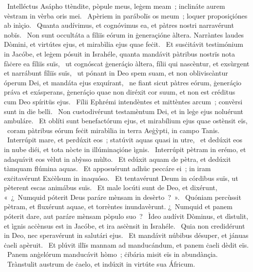 {~Intelléctus Asápho}
{%
ttèndite, pòpule meus, leġem meam~; inclináte aurem vèstram in vèrba oris mei.
~Apèriem in parábolïs os meum~; loquer proposiçiónes ab inìçio.
~Quanta audívimus, et cognóvimus ea, et pàtres nostri narravérunt nobïs.
~Non sunt occultáta a fíliïs eórum in ġeneraçióne àltera. Narràntes laudes Dòmini, et virtútes ejus, et mirabìlia ejus quae feċit.
~Et susċitávit testimónium in Jacóbe, et leġem pósuit in Israhéle, quanta mandávit pàtribus nostrïs nota fàċere ea fíliïs suïs,
~ut cognóscat ġeneráçio àltera, fílii qui nascèntur, et exsùrgent et narrábunt fíliïs suïs,
~ut pónant in Deo spem suam, et non obliviscàntur óperum Dei, et mandáta ejus exquírant,
~ne fiant sicut pàtres eórum, ġeneráçio práva et exásperans, ġeneráçio quae non diréxit cor suum, et non est créditus cum Deo spíritüs ejus.
~Fílii Ephrémi intendèntes et mittèntes arcum~; convèrsi sunt in die belli.
~Non custodivérunt testamèntum Dei, et in leġe ejus noluérunt ambuláre.
~Et oblíti sunt benefactórum ejus, et mirabílium ejus quae ostènsit eïs,
~coram pàtribus eórum feċit mirabìlia in terra Aeġỳpti, in campo Tanis.
~Interrúpit mare, et perdúxit eos~; statúvit aquas quasi in utre,
~et dedúxit eos in nube diéi, et tota nòcte in illúminaçióne ìgnis.
~Interrúpit pètram in erémo, et adaquávit eos vèlut in abỳsso mùlto.
~Et edúxit aquam de pètra, et dedúxit tàmquam flúmina aquas.
~Et apposuérunt adhüc peccáre ei~; in iram exċitavérunt Exċèlsum in inaquóso.
~Et tentavérunt Deum in córdibus suïs, ut pèterent escas animábus suïs.
~Et male locúti sunt de Deo, et dixérunt, «~¿~Numquid póterit Deus paráre mènsam in desèrto~?~».
~Quóniam percùssit pètram, et fluxérunt aquae, et torrèntes inundavèrunt. ¿~Numquid et panem póterit dare, aut paráre mènsam pòpulo suo~?
~Ìdeo audívit Dòminus, et dìstulit, et ìgnis acċènsus est in Jacóbe, et ira asċènsit in Israhéle.
~Quia non credidérunt in Deo, nec speravérunt in salutári ejus.
~Et mandávit núbibus désuper, et jánuas ċaeli apèruit.
~Et plúvit illïs mannam ad manducándum, et panem ċaeli dèdit eïs.
~Panem anġelórum manducávit hòmo~; ċibária misit eïs in abundànçia.
~Trànstulit austrum de ċaelo, et indúxit in virtúte sua Áfricum.
}
